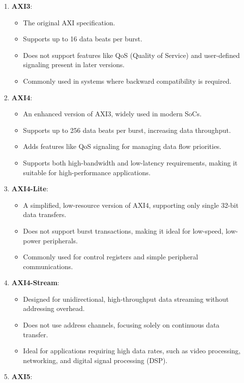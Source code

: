 \begin{enumerate}
\def\labelenumi{\arabic{enumi}.}
\tightlist
\item
  \textbf{AXI3}:

  \begin{itemize}
  \tightlist
  \item
    The original AXI specification.
  \item
    Supports up to 16 data beats per burst.
  \item
    Does not support features like QoS (Quality of Service) and
    user-defined signaling present in later versions.
  \item
    Commonly used in systems where backward compatibility is required.
  \end{itemize}
\item
  \textbf{AXI4}:

  \begin{itemize}
  \tightlist
  \item
    An enhanced version of AXI3, widely used in modern SoCs.
  \item
    Supports up to 256 data beats per burst, increasing data throughput.
  \item
    Adds features like QoS signaling for managing data flow priorities.
  \item
    Supports both high-bandwidth and low-latency requirements, making it
    suitable for high-performance applications.
  \end{itemize}
\item
  \textbf{AXI4-Lite}:

  \begin{itemize}
  \tightlist
  \item
    A simplified, low-resource version of AXI4, supporting only single
    32-bit data transfers.
  \item
    Does not support burst transactions, making it ideal for low-speed,
    low-power peripherals.
  \item
    Commonly used for control registers and simple peripheral
    communications.
  \end{itemize}
\item
  \textbf{AXI4-Stream}:

  \begin{itemize}
  \tightlist
  \item
    Designed for unidirectional, high-throughput data streaming without
    addressing overhead.
  \item
    Does not use address channels, focusing solely on continuous data
    transfer.
  \item
    Ideal for applications requiring high data rates, such as video
    processing, networking, and digital signal processing (DSP).
  \end{itemize}
\item
  \textbf{AXI5}:


\end{enumerate}
